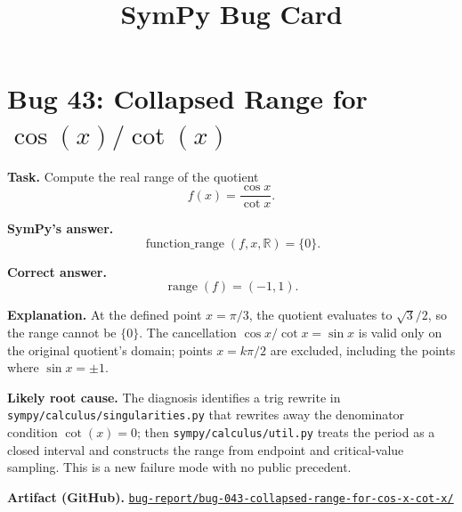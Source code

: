 \documentclass[11pt]{article}
\title{SymPy Bug Card}
\author{}
\date{}
\newcommand{\artifactrepo}{https://github.com/TODO-org/TODO-repo}
\newcommand{\bugbundle}[1]{\href{\artifactrepo/tree/main/bug-report/#1}{\nolinkurl{bug-report/#1/}}}
\begin{document}
\maketitle

\section*{Bug 43: Collapsed Range for \texorpdfstring{$\cos(x)/\cot(x)$}{cos(x)/cot(x)}}

\begin{counterexamplebox}
\textbf{Task.} Compute the real range of the quotient
\[
f(x)=\frac{\cos x}{\cot x}.
\]

\medskip
\textbf{SymPy's answer.}
\[
\operatorname{function\_range}(f,x,\mathbb{R})=\{0\}.
\]

\medskip
\textbf{Correct answer.}
\[
\operatorname{range}(f)=(-1,1).
\]

\medskip
\textbf{Explanation.} At the defined point \(x=\pi/3\), the quotient evaluates to \(\sqrt{3}/2\), so the range cannot be \(\{0\}\). The cancellation \(\cos x/\cot x=\sin x\) is valid only on the original quotient's domain; points \(x=k\pi/2\) are excluded, including the points where \(\sin x=\pm 1\).

\medskip
\textbf{Likely root cause.} The diagnosis identifies a trig rewrite in \nolinkurl{sympy/calculus/singularities.py} that rewrites away the denominator condition \(\cot(x)=0\); then \nolinkurl{sympy/calculus/util.py} treats the period as a closed interval and constructs the range from endpoint and critical-value sampling. This is a new failure mode with no public precedent.

\medskip
\textbf{Artifact (GitHub).} \bugbundle{bug-043-collapsed-range-for-cos-x-cot-x}
\end{counterexamplebox}
\end{document}
